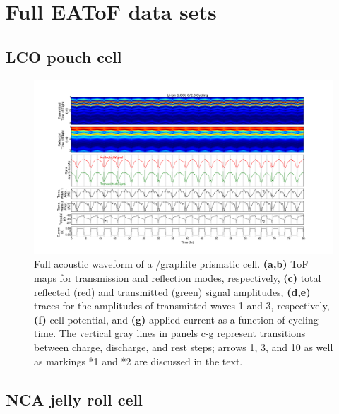 \chapter{Full EAToF data sets\label{ch:fulldata}}

\section{LCO pouch cell}

\begin{figure}[htb]
  \centering
    \includegraphics[width=\textwidth]{ch-appendices/images/lcofull.png}
    \caption[Full acoustic waveform of a /graphite prismatic cell.]{Full acoustic waveform of a /graphite prismatic cell. \textbf{(a,b)} ToF maps for transmission and reflection modes, respectively, \textbf{(c)} total reflected (red) and transmitted (green) signal amplitudes, \textbf{(d,e)} traces for the amplitudes of transmitted waves 1 and 3, respectively, \textbf{(f)} cell potential, and \textbf{(g)} applied current as a function of cycling time. The vertical gray lines in panels c-g represent transitions between charge, discharge, and rest steps; arrows 1, 3, and 10 as well as markings *1 and *2 are discussed in the text.}
    \label{fig:lcofull}
\end{figure} 

\section{NCA jelly roll cell}

